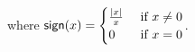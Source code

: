 \begin{proposition}
\begin{align}
\end{align}
where $\mathsf{sign}(x) = \begin{cases}\frac{|x|}{x} & \text{ if $x \neq 0$} \\ 0 & \text{ if $x = 0$}\end{cases}$.
\end{proposition}
%

